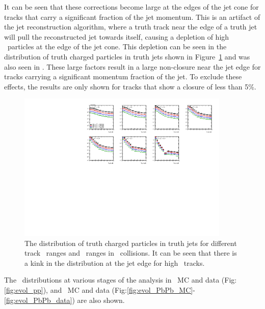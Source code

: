 It can be seen that these corrections become large at the edges of the jet cone for tracks that carry a significant fraction of the jet momentum.
This is an artifact of the jet reconstruction algorithm, where a truth track near the edge of a truth jet will pull the reconstructed jet towards itself, causing a depletion of high \pt\ particles at the edge of the jet cone.
This depletion can be seen in the distribution of truth charged particles in truth jets shown in Figure~\ref{fig:truthProj_pp} and was also seen in \cite{Choudalakis:1248716}.
These large factors result in a large non-closure near the jet edge for tracks carrying a significant momentum fraction of the jet.
To exclude these effects, the results are only shown for tracks that show a closure of less than 5\%.

\begin{figure}
\centering
\includegraphics[page=1, width=0.9\textwidth]{figures/main/corrections/TruthProj_pp}
\caption{The distribution of truth charged particles in truth jets for different track \pt\ ranges and \ptjet\ ranges in \pp\ collisions.
It can be seen that there is a kink in the distribution at the jet edge for high \pt\ tracks.}
\label{fig:truthProj_pp}
\end{figure}


The \Dptr\ distributions at various stages of the analysis in \pp\ MC and data (Fig:\ref{fig:evol_pp}), and \pbpb\ MC and data (Fig:\ref{fig:evol_PbPb_MC}-\ref{fig:evol_PbPb_data}) are also shown.

